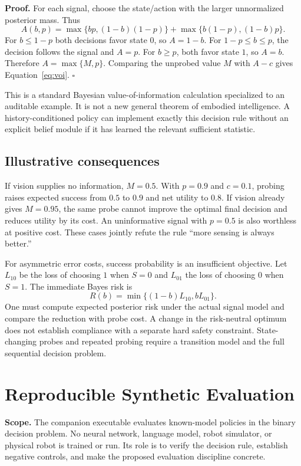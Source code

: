 \documentclass[11pt]{article}
\begin{document}
\textbf{Proof.}
For each signal, choose the state/action with the larger unnormalized posterior mass. Thus
\begin{equation}
A(b,p)=\max\{bp,(1-b)(1-p)\}
+\max\{b(1-p),(1-b)p\}.
\end{equation}
For $b\leq1-p$ both decisions favor state $0$, so $A=1-b$. For $1-p\leq b\leq p$, the decision follows the signal and $A=p$. For $b\geq p$, both favor state $1$, so $A=b$. Therefore $A=\max\{M,p\}$. Comparing the unprobed value $M$ with $A-c$ gives Equation~\ref{eq:voi}. $\square$

This is a standard Bayesian value-of-information calculation specialized to an auditable example. It is not a new general theorem of embodied intelligence. A history-conditioned policy can implement exactly this decision rule without an explicit belief module if it has learned the relevant sufficient statistic.

\subsection{Illustrative consequences}
If vision supplies no information, $M=0.5$. With $p=0.9$ and $c=0.1$, probing raises expected success from $0.5$ to $0.9$ and net utility to $0.8$. If vision already gives $M=0.95$, the same probe cannot improve the optimal final decision and reduces utility by its cost. An uninformative signal with $p=0.5$ is also worthless at positive cost. These cases jointly refute the rule ``more sensing is always better.''

For asymmetric error costs, success probability is an insufficient objective. Let $L_{10}$ be the loss of choosing $1$ when $S=0$ and $L_{01}$ the loss of choosing $0$ when $S=1$. The immediate Bayes risk is
\begin{equation}
R(b)=\min\{(1-b)L_{10},bL_{01}\}.
\end{equation}
One must compute expected posterior risk under the actual signal model and compare the reduction with probe cost. A change in the risk-neutral optimum does not establish compliance with a separate hard safety constraint. State-changing probes and repeated probing require a transition model and the full sequential decision problem.

\section{Reproducible Synthetic Evaluation}
\label{sec:synthetic}
\textbf{Scope.} The companion executable evaluates known-model policies in the binary decision problem. No neural network, language model, robot simulator, or physical robot is trained or run. Its role is to verify the decision rule, establish negative controls, and make the proposed evaluation discipline concrete.
\end{document}
